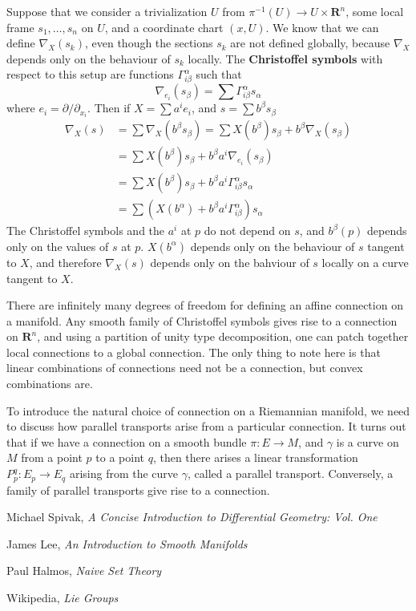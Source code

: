 Suppose that we consider a trivialization $U$ from $\pi^{-1}(U) \to U \times \mathbf{R}^n$, some local frame $s_1, \dots, s_n$ on $U$, and a coordinate chart $(x,U)$. We know that we can define $\nabla_X(s_k)$, even though the sections $s_k$ are not defined globally, because $\nabla_X$ depends only on the behaviour of $s_k$ locally.  The {\bf Christoffel symbols} with respect to this setup are functions $\Gamma_{i \beta}^\alpha$ such that
%
\[ \nabla_{e_i}(s_\beta) = \sum \Gamma_{i \beta}^\alpha s_\alpha \]
%
where $e_i = \partial/\partial_{x_i}$. Then if $X = \sum a^i e_i$, and $s = \sum b^\beta s_\beta$
%
\begin{align*}
    \nabla_X(s) &= \sum \nabla_X(b^\beta s_\beta) = \sum X(b^\beta) s_\beta + b^\beta \nabla_X(s_\beta)\\
    &= \sum X(b^\beta) s_\beta + b^\beta a^i \nabla_{e_i}(s_\beta)\\
    &= \sum X(b^\beta) s_\beta + b^\beta a^i \Gamma_{i \beta}^\alpha s_\alpha\\
    &= \sum \left( X(b^\alpha) + b^\beta a^i \Gamma_{i \beta}^\alpha \right) s_\alpha
\end{align*}
%
The Christoffel symbols and the $a^i$ at $p$ do not depend on $s$, and $b^\beta(p)$ depends only on the values of $s$ at $p$. $X(b^\alpha)$ depends only on the behaviour of $s$ tangent to $X$, and therefore $\nabla_X(s)$ depends only on the bahviour of $s$ locally on a curve tangent to $X$.

There are infinitely many degrees of freedom for defining an affine connection on a manifold. Any smooth family of Christoffel symbols gives rise to a connection on $\mathbf{R}^n$, and using a partition of unity type decomposition, one can patch together local connections to a global connection. The only thing to note here is that linear combinations of connections need not be a connection, but convex combinations are.

To introduce the natural choice of connection on a Riemannian manifold, we need to discuss how parallel transports arise from a particular connection. It turns out that if we have a connection on a smooth bundle $\pi: E \to M$, and $\gamma$ is a curve on $M$ from a point $p$ to a point $q$, then there arises a linear transformation $P_p^q: E_p \to E_q$ arising from the curve $\gamma$, called a parallel transport. Conversely, a family of parallel transports give rise to a connection.

\begin{thebibliography}{10}
     Michael Spivak,
    \emph{A Concise Introduction to Differential Geometry: Vol. One}

     James Lee,
    \emph{An Introduction to Smooth Manifolds}

     Paul Halmos,
    \emph{Naive Set Theory}

     Wikipedia,
    \emph{Lie Groups}
\end{thebibliography}













